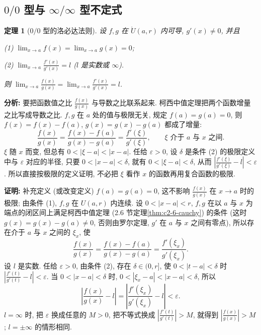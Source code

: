 \documentclass[UTF8,openany]{ctexbook}
\theoremstyle{chinesetextbook}
\newtheorem{theorem}{定理}[section]
\newenvironment{cnproof}{\par\indent\textbf{证明:} \ignorespaces}{\par}
\begin{document}
\subsection{\texorpdfstring{$0/0$ 型与 $\infty/\infty$ 型不定式}{0/0 型与 ∞/∞ 型不定式}}
\begin{theorem}[$0/0$ 型的洛必达法则]\label{thm:c2-7-lh1}
设 $f,g$ 在 $\mathring U(a,r)$ 内可导, $g'(x)\ne0$, 并且

\textup{(1)} $\displaystyle\lim_{x\to a}f(x)=\lim_{x\to a}g(x)=0$;

\textup{(2)} $\displaystyle\lim_{x\to a}\frac{f'(x)}{g'(x)}=l$ ($l$ 是实数或 $\infty$).

则 $\displaystyle\lim_{x\to a}\frac{f(x)}{g(x)}=\lim_{x\to a}\frac{f'(x)}{g'(x)}=l$.
\end{theorem}
\par\indent\textbf{分析:} 要把函数值之比 $\displaystyle\frac{f(x)}{g(x)}$ 与导数之比联系起来. 柯西中值定理把两个函数增量之比写成导数之比. $f,g$ 在 $a$ 处的值与极限无关, 规定 $f(a)=g(a)=0$, 则 $f(x)=f(x)-f(a)$, $g(x)=g(x)-g(a)$ 都成了增量:
\[
\frac{f(x)}{g(x)}=\frac{f(x)-f(a)}{g(x)-g(a)}=\frac{f'(\xi)}{g'(\xi)},\qquad\xi\text{ 介于 }a\text{ 与 }x\text{ 之间}.
\]
$\xi$ 随 $x$ 而变, 但总有 $0<|\xi-a|<|x-a|$. 任给 $\varepsilon>0$, 设 $\delta$ 是条件 (2) 的极限定义中与 $\varepsilon$ 对应的半径, 只要 $0<|x-a|<\delta$, 就有 $0<|\xi-a|<\delta$, 从而 $\displaystyle\left|\frac{f'(\xi)}{g'(\xi)}-l\right|<\varepsilon$. 所以直接按极限的定义证明, 不必把 $\xi$ 看作 $x$ 的函数再用复合函数的极限.
\begin{cnproof}
补充定义 (或改变定义) $f(a)=g(a)=0$, 这不影响 $\displaystyle\frac{f(x)}{g(x)}$ 在 $x\to a$ 时的极限; 由条件 (1), $f,g$ 在 $U(a,r)$ 内连续. 设 $0<|x-a|<r$, $f,g$ 在以 $a$ 与 $x$ 为端点的闭区间上满足柯西中值定理 (2.6 节定理\ref{thm:c2-6-cauchy}) 的条件 (这时 $g(x)=g(x)-g(a)\ne0$, 否则由罗尔定理, $g'$ 在 $a$ 与 $x$ 之间有零点), 所以存在介于 $a$ 与 $x$ 之间的 $\xi_x$, 使
\[
\frac{f(x)}{g(x)}=\frac{f(x)-f(a)}{g(x)-g(a)}=\frac{f'(\xi_x)}{g'(\xi_x)}.
\]
设 $l$ 是实数. 任给 $\varepsilon>0$, 由条件 (2), 存在 $\delta\in(0,r]$, 使 $0<|t-a|<\delta$ 时 $\displaystyle\left|\frac{f'(t)}{g'(t)}-l\right|<\varepsilon$. 当 $0<|x-a|<\delta$ 时, $0<|\xi_x-a|<|x-a|<\delta$, 所以
\[
\left|\frac{f(x)}{g(x)}-l\right|=\left|\frac{f'(\xi_x)}{g'(\xi_x)}-l\right|<\varepsilon.
\]
$l=\infty$ 时, 把 $\varepsilon$ 换成任意的 $M>0$, 把不等式换成 $\displaystyle\left|\frac{f'(t)}{g'(t)}\right|>M$, 就得到 $\displaystyle\left|\frac{f(x)}{g(x)}\right|>M$; $l=\pm\infty$ 的情形相同.
\end{cnproof}
\end{document}
